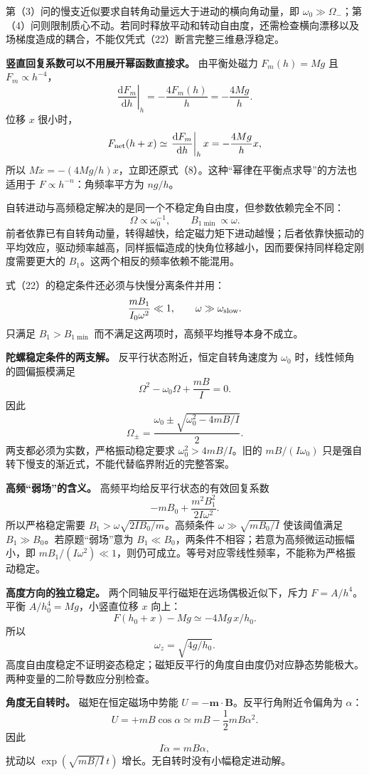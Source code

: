 \documentclass[12pt,a4paper,UTF8]{ctexart}
\begin{document}
第（3）问的慢支近似要求自转角动量远大于进动的横向角动量，即
\(\omega_0\gg\Omega_-\)；第（4）问则限制质心不动。若同时释放平动和转动自由度，还需检查横向漂移以及场梯度造成的耦合，不能仅凭式（22）断言完整三维悬浮稳定。

\textbf{竖直回复系数可以不用展开幂函数直接求。} 由平衡处磁力
\(F_m(h)=Mg\) 且 \(F_m\propto h^{-4}\)， \[
\left.\frac{\mathrm dF_m}{\mathrm dh}\right|_h
=-\frac{4F_m(h)}h
=-\frac{4Mg}{h}.
\] 位移 \(x\) 很小时， \[
F_{\rm net}(h+x)
\simeq\left.\frac{\mathrm dF_m}{\mathrm dh}\right|_h x
=-\frac{4Mg}{h}x,
\] 所以
\(M\ddot x=-(4Mg/h)x\)，立即还原式（8）。这种``幂律在平衡点求导''的方法也适用于
\(F\propto h^{-n}\)：角频率平方为 \(ng/h\)。

自转进动与高频稳定解决的是同一个不稳定角自由度，但参数依赖完全不同： \[
\Omega\propto\omega_0^{-1},
\qquad
B_{1\min}\propto\omega.
\]
前者依靠已有自转角动量，转得越快，给定磁力矩下进动越慢；后者依靠快振动的平均效应，驱动频率越高，同样振幅造成的快角位移越小，因而要保持同样稳定刚度需要更大的
\(B_1\)。这两个相反的频率依赖不能混用。

式（22）的稳定条件还必须与快慢分离条件并用： \[
\frac{mB_1}{I_0\omega^2}\ll1,
\qquad
\omega\gg\omega_{\rm slow}.
\] 只满足 \(B_1>B_{1\min}\) 而不满足这两项时，高频平均推导本身不成立。

\textbf{陀螺稳定条件的两支解。} 反平行状态附近，恒定自转角速度为
\(\omega_0\) 时，线性倾角的圆偏振模满足 \[
\Omega^2-\omega_0\Omega+\frac{mB}{I}=0.
\] 因此 \[
\boxed{\Omega_\pm=\frac{\omega_0\pm\sqrt{\omega_0^2-4mB/I}}2}.
\] 两支都必须为实数，严格振动稳定要求 \(\omega_0^2>4mB/I\)。旧的
\(mB/(I\omega_0)\)
只是强自转下慢支的渐近式，不能代替临界附近的完整答案。

\textbf{高频``弱场''的含义。} 高频平均给反平行状态的有效回复系数 \[
-mB_0+\frac{m^2B_1^2}{2I\omega^2}.
\] 所以严格稳定需要 \(B_1>\omega\sqrt{2IB_0/m}\)。高频条件
\(\omega\gg\sqrt{mB_0/I}\) 使该阈值满足
\(B_1\gg B_0\)。若原题``弱场''意为
\(B_1\ll B_0\)，两条件不相容；若意为高频微运动振幅小，即
\(mB_1/(I\omega^2)\ll1\)，则仍可成立。等号对应零线性频率，不能称为严格振动稳定。

\textbf{高度方向的独立稳定。} 两个同轴反平行磁矩在远场偶极近似下，斥力
\(F=A/h^4\)。平衡 \(A/h_0^4=Mg\)，小竖直位移 \(x\) 向上： \[
F(h_0+x)-Mg\simeq-4Mg\,x/h_0.
\] 所以 \[
\boxed{\omega_z=\sqrt{4g/h_0}}.
\]
高度自由度稳定不证明姿态稳定；磁矩反平行的角度自由度仍对应静态势能极大。两种变量的二阶导数应分别检查。

\textbf{角度无自转时。} 磁矩在恒定磁场中势能
\(U=-\boldsymbol m\cdot\boldsymbol B\)。反平行角附近令偏角为
\(\alpha\)： \[
U=+mB\cos\alpha\simeq mB-\frac12mB\alpha^2.
\] 因此 \[
I\ddot\alpha=mB\alpha,
\] 扰动以 \(\exp(\sqrt{mB/I}\,t)\) 增长。无自转时没有小幅稳定进动解。
\end{document}
